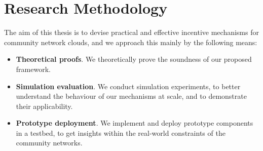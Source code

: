 

\section{Research Methodology}
\label{sec__methodology}

The aim of this thesis is to devise practical and effective incentive mechanisms for community network clouds,
and we approach this mainly by the following means:

\begin{itemize}

	\item \textbf{Theoretical proofs}. We theoretically prove the soundness of our proposed framework.
	
	\item \textbf{Simulation evaluation}. We conduct simulation experiments, to better understand the behaviour of our mechanisms at scale, and to demonstrate their applicability.
	
	\item \textbf{Prototype deployment}. We implement and deploy prototype components in a testbed, to get insights within the real-world constraints of the community networks.
	
\end{itemize}

